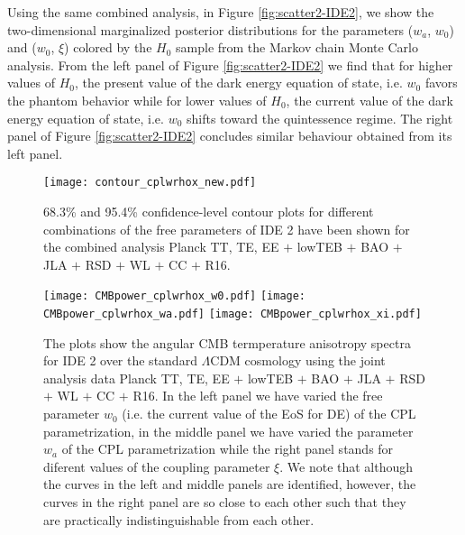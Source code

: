 \documentclass[superscriptaddress,oneolumn,secnumarabic,
amssymb,amsmath,nobibnotes,aps,prd,showpacs,nofootinbib]{revtex4}%
\begin{document}
Using the same combined analysis, in Figure \ref{fig:scatter2-IDE2}, we show the two-dimensional marginalized posterior distributions
for the parameters ($w_a$, $w_0$) and ($w_0$, $\xi$) colored by the $H_0$
sample from the Markov chain Monte Carlo analysis. From the left panel of Figure \ref{fig:scatter2-IDE2} we find that for higher values of $H_0$, the present value of the dark energy equation of state, i.e. $w_0$ favors the phantom behavior while for lower values of $H_0$, the current value of the dark energy equation of state, i.e. $w_0$ shifts toward the quintessence regime. The right panel of Figure \ref{fig:scatter2-IDE2} concludes similar behaviour obtained from its left panel.


	\begin{figure}%
		\texttt{[image: contour\_cplwrhox\_new.pdf]}
		\caption{68.3\% and 95.4\% confidence-level contour plots for different combinations of the free parameters of IDE 2 have been shown for the combined analysis Planck TT, TE, EE $+$ lowTEB $+$ BAO $+$ JLA $+$ RSD $+$ WL $+$ CC $+$ R16. }
		\label{fig:contourII}
	\end{figure}

	\begin{figure}%
		\texttt{[image: CMBpower\_cplwrhox\_w0.pdf]}
		\texttt{[image: CMBpower\_cplwrhox\_wa.pdf]}
		\texttt{[image: CMBpower\_cplwrhox\_xi.pdf]}
		\caption{The plots show the angular CMB termperature anisotropy spectra for IDE 2 over the standard $\Lambda$CDM cosmology using the joint analysis data Planck TT, TE, EE $+$ lowTEB $+$ BAO $+$ JLA $+$ RSD $+$ WL $+$ CC $+$ R16. In the left panel we have varied the free parameter $w_0$ (i.e. the current value of the EoS for DE) of the CPL parametrization, in the middle panel we have varied the parameter $w_a$ of the CPL parametrization while the right panel stands for diferent values of the coupling parameter $\xi$. We note that although the curves in the left and middle panels are identified, however, the curves in the right panel are so close to each other such that they are practically indistinguishable from each other. }
		\label{fig:cmbplotII}
	\end{figure}
\end{document}

